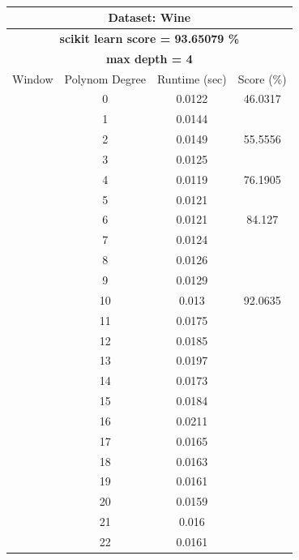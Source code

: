 \documentclass{article}
\begin{document}
\begin{multicols}{2}
\begin{table}[H]
\caption{}
\label{tab:my-table}
\begin{tabular}{|c|c|c|c|}
\hline
\multicolumn{4}{|c|}{\textbf{Dataset: Wine}} \\ \hline
\multicolumn{4}{|c|}{\textbf{scikit learn score = 93.65079 \%}} \\ \hline
\multicolumn{4}{|c|}{\textbf{max depth = 4}} \\ \hline
Window & Polynom Degree & Runtime (sec) & Score (\%) \\ \hline
 & 0 & 0.0122 & 46.0317 \\ \cline{2-4} 
 & 1 & 0.0144 &  \\ \cline{2-3}
 & 2 & 0.0149 & \multirow{-2}{*}{55.5556} \\ \cline{2-4} 
 & 3 & 0.0125 &  \\ \cline{2-3}
 & 4 & 0.0119 & \multirow{-2}{*}{76.1905} \\ \cline{2-4} 
 & 5 & 0.0121 &  \\ \cline{2-3}
 & 6 & 0.0121 & \multirow{-2}{*}{84.127} \\ \cline{2-4} 
 & 7 & 0.0124 &  \\ \cline{2-3}
 & 8 & 0.0126 &  \\ \cline{2-3}
 & 9 & 0.0129 &  \\ \cline{2-3}
 & 10 & 0.013 & \multirow{-4}{*}{92.0635} \\ \cline{2-4} 
 & \cellcolor[HTML]{FFFFC7}11 & \cellcolor[HTML]{FFFFC7}0.0175 & \cellcolor[HTML]{FFFFC7} \\ \cline{2-3}
 & 12 & 0.0185 & \cellcolor[HTML]{FFFFC7} \\ \cline{2-3}
 & 13 & 0.0197 & \cellcolor[HTML]{FFFFC7} \\ \cline{2-3}
 & 14 & 0.0173 & \cellcolor[HTML]{FFFFC7} \\ \cline{2-3}
 & 15 & 0.0184 & \cellcolor[HTML]{FFFFC7} \\ \cline{2-3}
 & 16 & 0.0211 & \cellcolor[HTML]{FFFFC7} \\ \cline{2-3}
 & 17 & 0.0165 & \cellcolor[HTML]{FFFFC7} \\ \cline{2-3}
 & 18 & 0.0163 & \cellcolor[HTML]{FFFFC7} \\ \cline{2-3}
 & 19 & 0.0161 & \cellcolor[HTML]{FFFFC7} \\ \cline{2-3}
 & 20 & 0.0159 & \cellcolor[HTML]{FFFFC7} \\ \cline{2-3}
 & 21 & 0.016 & \cellcolor[HTML]{FFFFC7} \\ \cline{2-3}
 & 22 & 0.0161 & \cellcolor[HTML]{FFFFC7} \\ \cline{2-3}

\end{tabular}
\end{table}
\end{multicols}
\end{document}
